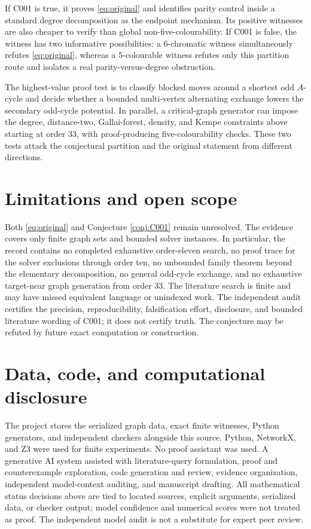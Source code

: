 \documentclass[11pt]{amsart}
\theoremstyle{definition}
\begin{document}
If C001 is true, it proves \eqref{eq:original} and identifies parity control
inside a standard degree decomposition as the endpoint mechanism.  Its
positive witnesses are also cheaper to verify than global non-five-colourability.
If C001 is false, the witness has two informative possibilities: a
$6$-chromatic witness simultaneously refutes \eqref{eq:original}, whereas a
$5$-colourable witness refutes only this partition route and isolates a real
parity-versus-degree obstruction.

The highest-value proof test is to classify blocked moves around a shortest
odd $A$-cycle and decide whether a bounded multi-vertex alternating exchange
lowers the secondary odd-cycle potential.  In parallel, a critical-graph
generator can impose the degree, distance-two, Gallai-forest, density, and
Kempe constraints above starting at order $33$, with proof-producing
five-colourability checks.  These two tests attack the conjectural partition
and the original statement from different directions.

\section{Limitations and open scope}

Both \eqref{eq:original} and Conjecture \ref{conj:C001} remain unresolved.
The evidence covers only finite graph sets and bounded solver instances.  In
particular, the record contains no completed exhaustive order-eleven search,
no proof trace for the solver exclusions through order ten, no unbounded
family theorem beyond the elementary decomposition, no general odd-cycle
exchange, and no exhaustive target-near graph generation from order $33$.
The literature search is finite and may have missed equivalent language or
unindexed work.  The independent audit certifies the precision,
reproducibility, falsification effort, disclosure, and bounded literature
wording of C001; it does not certify truth.  The conjecture may be refuted by
future exact computation or construction.

\section*{Data, code, and computational disclosure}

The project stores the serialized graph data, exact finite witnesses, Python
generators, and independent checkers alongside this source.  Python,
NetworkX, and Z3 were used for finite experiments.  No proof assistant was
used.  A generative AI system assisted with literature-query formulation,
proof and counterexample exploration, code generation and review, evidence
organization, independent model-context auditing, and manuscript drafting.
All mathematical status decisions above are tied to located sources, explicit
arguments, serialized data, or checker output; model confidence and numerical
scores were not treated as proof.  The independent model audit is not a
substitute for expert peer review.



\end{document}
